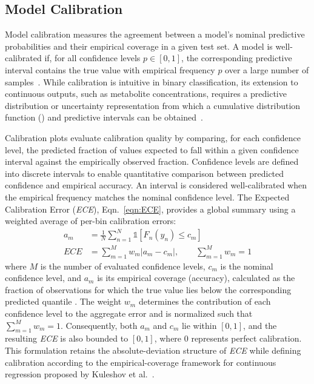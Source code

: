\subsection{Model Calibration}\label{sec:Analy&Visual:subsec:calibration}
Model calibration measures the agreement between a model's nominal predictive probabilities and their empirical coverage in a given test set. A model is well-calibrated if, for all confidence levels $p \in [0,1]$, the corresponding predictive interval contains the true value with empirical frequency $p$ over a large number of samples~\cite{DeGroot1983, Walpole2012, Wasserstein2019}. While calibration is intuitive in binary classification, its extension to continuous outputs, such as metabolite concentrations, requires a predictive distribution or uncertainty representation from which a cumulative distribution function (\CDF) and predictive intervals can be obtained~\cite{Kuleshov2018}.

Calibration plots evaluate calibration quality by comparing, for each confidence level, the predicted fraction of values expected to fall within a given confidence interval against the empirically observed fraction. Confidence levels are defined into discrete intervals to enable quantitative comparison between predicted confidence and empirical accuracy. An interval is considered well-calibrated when the empirical frequency matches the nominal confidence level. The Expected Calibration Error (\textit{ECE}), Eqn.~\ref{eqn:ECE}, provides a global summary using a weighted average of per-bin calibration errors:
\begin{equation}\label{eqn:ECE}
    \begin{aligned}
        a_m &= \frac{1}{N}\sum_{n=1}^{N}
        \mathbb{1}\left[F_n(y_n)\leq c_m\right] \\
        ECE &= \sum_{m=1}^{M} w_m\left|a_m-c_m\right|,
        \qquad \sum_{m=1}^{M}w_m=1
    \end{aligned}
\end{equation}
\noindent where $M$ is the number of evaluated confidence levels, $c_m$ is the nominal confidence level, and $a_m$ is its empirical coverage (accuracy), calculated as the fraction of observations for which the true value lies below the corresponding predicted quantile \cite{Kuleshov2018}. The weight $w_m$ determines the contribution of each confidence level to the aggregate error and is normalized such that $\sum_{m=1}^{M}w_m=1$. Consequently, both $a_m$ and $c_m$ lie within $[0,1]$, and the resulting \textit{ECE} is also bounded to $[0,1]$, where $0$ represents perfect calibration. This formulation retains the absolute-deviation structure of \textit{ECE} while defining calibration according to the empirical-coverage framework for continuous regression proposed by Kuleshov et al.~\cite{Kuleshov2018}.

